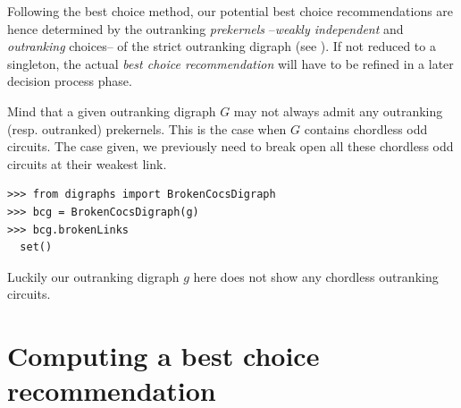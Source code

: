 Following the \Rubis best choice method, our potential best choice recommendations are hence determined by the outranking \emph{prekernels} --\emph{weakly independent} and \emph{outranking} choices-- of the strict outranking digraph (see \citet{BIS-2008a}). If not reduced to a singleton, the actual \emph{best choice recommendation} will have to be refined in a later decision process phase.

Mind that a given outranking digraph $G$ may not always admit any outranking (resp. outranked) prekernels. This is the case when $G$ contains chordless odd circuits. The case given, we previously need to break open all these chordless odd circuits at their weakest link.
\begin{lstlisting}
>>> from digraphs import BrokenCocsDigraph
>>> bcg = BrokenCocsDigraph(g)
>>> bcg.brokenLinks
  set()
\end{lstlisting}
Luckily our outranking digraph $g$ here does not show any chordless outranking circuits.

\section{Computing a best choice recommendation}
\label{sec:6.4}

